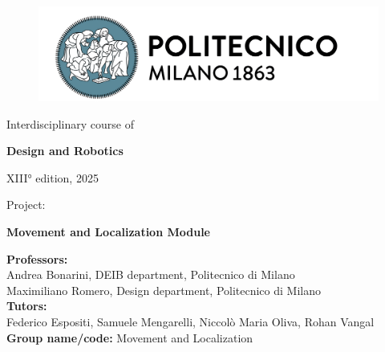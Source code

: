 \begin{titlepage}
   \begin{center}
       
       \begin{figure}[h]
       \begin{center}
           \includegraphics[width=0.9\linewidth]{photos/polimiLogo.png}
       \end{center}
       \end{figure}

       \vspace{0.5cm}
       
       {\large Interdisciplinary course of}
       
       \vspace{0.3cm}
       
       {\LARGE \textbf{Design and Robotics}}
       
       \vspace{0.3cm}
       
       {\large XIII° edition, 2025}
       
       \vspace{1.5cm}
       
       {\large Project:}
       
       \vspace{0.3cm}
       
       {\LARGE \textbf{Movement and Localization Module}}
       
       \vspace{2cm}
       
       \begin{flushleft}
           {\large \textbf{Professors:}} \\
           Andrea Bonarini, DEIB department, Politecnico di Milano \\
           Maximiliano Romero, Design department, Politecnico di Milano \\
           \vspace{0.5cm}
           {\large \textbf{Tutors:}} \\
           Federico Espositi, Samuele Mengarelli, Niccolò Maria Oliva, Rohan Vangal \\
           \vspace{0.5cm}
           {\large \textbf{Group name/code:}} Movement and Localization \\
       \end{flushleft}
       

\end{center}
\end{titlepage}
